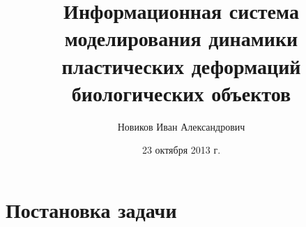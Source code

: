 \documentclass[usenames,dvipsnames,pdftex,unicode,hidelinks]{beamer}
\title[Система моделирования деформаций биологических объектов]{Информационная система моделирования динамики пластических деформаций биологических объектов}
\author[Иван Новиков]{Новиков Иван Александрович}
\institute{Кубанский Государственный Университет}
\date{ 23 октября 2013 г. }
\begin{document}
  
  {
    \begin{frame}[plain]
      \titlepage
    \end{frame}
  }

  \section{Постановка задачи}
\end{document}
